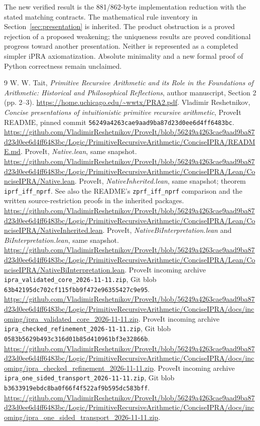 \documentclass[11pt]{article}
\theoremstyle{definition}\newtheorem{definition}[theorem]{Definition}
\theoremstyle{remark}\newtheorem{remark}[theorem]{Remark}
\begin{document}
The new verified result is the 881/862-byte implementation reduction with
the stated matching contracts. The mathematical rule inventory in
Section~\ref{sec:presentation} is inherited. The product obstruction is a
proved rejection of a proposed weakening; the uniqueness results are
proved conditional progress toward another presentation. Neither is
represented as a completed simpler iPRA axiomatization. Absolute
minimality and a new formal proof of Python correctness remain unclaimed.

\begin{thebibliography}{9}
 W. W. Tait, \emph{Primitive Recursive Arithmetic and its
Role in the Foundations of Arithmetic: Historical and Philosophical
Reflections}, author manuscript, Section 2 (pp. 2--3).
\url{https://home.uchicago.edu/~wwtx/PRA2.pdf}.
 Vladimir Reshetnikov, \emph{Concise presentations of
intuitionistic primitive recursive arithmetic}, ProveIt README, pinned
commit \texttt{56249a4263cae9aad9ba87d23d0ee6d4ff6483bc}.
\url{https://github.com/VladimirReshetnikov/ProveIt/blob/56249a4263cae9aad9ba87d23d0ee6d4ff6483bc/Logic/PrimitiveRecursiveArithmetic/ConciseIPRA/README.md}.
 ProveIt, \emph{Native.lean}, same snapshot.
\url{https://github.com/VladimirReshetnikov/ProveIt/blob/56249a4263cae9aad9ba87d23d0ee6d4ff6483bc/Logic/PrimitiveRecursiveArithmetic/ConciseIPRA/Lean/ConciseIPRA/Native.lean}.
 ProveIt, \emph{NativeInherited.lean}, same snapshot;
theorem \texttt{iprf\_iff\_nprf}. See also the README's
\texttt{zprf\_iff\_nprf} comparison and the written source-restriction
proofs in the inherited packages.
\url{https://github.com/VladimirReshetnikov/ProveIt/blob/56249a4263cae9aad9ba87d23d0ee6d4ff6483bc/Logic/PrimitiveRecursiveArithmetic/ConciseIPRA/Lean/ConciseIPRA/NativeInherited.lean}.
 ProveIt, \emph{NativeBiInterpretation.lean} and
\emph{BiInterpretation.lean}, same snapshot.
\url{https://github.com/VladimirReshetnikov/ProveIt/blob/56249a4263cae9aad9ba87d23d0ee6d4ff6483bc/Logic/PrimitiveRecursiveArithmetic/ConciseIPRA/Lean/ConciseIPRA/NativeBiInterpretation.lean}.
 ProveIt incoming archive
\texttt{ipra\_validated\_core\_2026-11-11.zip}, Git blob
\texttt{63b42195dc702cf115fbb9f472e96355427c9e95}.
\url{https://github.com/VladimirReshetnikov/ProveIt/blob/56249a4263cae9aad9ba87d23d0ee6d4ff6483bc/Logic/PrimitiveRecursiveArithmetic/ConciseIPRA/docs/incoming/ipra_validated_core_2026-11-11.zip}.
 ProveIt incoming archive
\texttt{ipra\_checked\_refinement\_2026-11-11.zip}, Git blob
\texttt{0583b5629b493c316d01b85d410961bf3e32866b}.
\url{https://github.com/VladimirReshetnikov/ProveIt/blob/56249a4263cae9aad9ba87d23d0ee6d4ff6483bc/Logic/PrimitiveRecursiveArithmetic/ConciseIPRA/docs/incoming/ipra_checked_refinement_2026-11-11.zip}.
 ProveIt incoming archive
\texttt{ipra\_one\_sided\_transport\_2026-11-11.zip}, Git blob
\texttt{b3633919ebdc8ba0f66f4f522af9b595dc583bff}.
\url{https://github.com/VladimirReshetnikov/ProveIt/blob/56249a4263cae9aad9ba87d23d0ee6d4ff6483bc/Logic/PrimitiveRecursiveArithmetic/ConciseIPRA/docs/incoming/ipra_one_sided_transport_2026-11-11.zip}.
\end{thebibliography}
\end{document}
